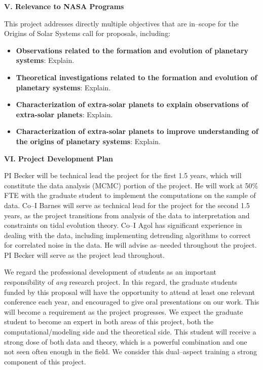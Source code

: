 \bigskip
\centerline{\bf V. Relevance to NASA Programs}
\smallskip

This project addresses directly multiple objectives that are in--scope
for the Origins of Solar Systems call for proposals, including:
\begin{itemize}

\item {\bf Observations related to the formation and evolution of
  planetary systems}: Explain.

\item {\bf Theoretical investigations related to the formation and
  evolution of planetary systems}: Explain.

\item {\bf Characterization of extra-solar planets to explain
  observations of extra-solar planets}: Explain.

\item {\bf Characterization of extra-solar planets to improve
  understanding of the origins of planetary systems}: Explain.

\end{itemize}



\bigskip
\centerline{\bf VI. Project Development Plan}
\smallskip

PI Becker will be technical lead the project for the first 1.5 years,
which will constitute the data analysis (MCMC) portion of the project.
He will work at 50\% FTE with the graduate student to implement the
computations on the \kepler sample of data.  Co--I Barnes will serve as
technical lead for the project for the second 1.5 years, as the
project transitions from analysis of the data to interpretation and
constraints on tidal evolution theory.  Co--I Agol has significant
experience in dealing with the \kepler data, including implementing
detrending algorithms to correct for correlated noise in the \kepler
data.  He will advise as--needed throughout the project.  PI Becker
will serve as the project lead throughout.

We regard the professional development of students as an important
responsibility of {\it any} research project.  In this regard, the
graduate students funded by this proposal will have the opportunity to
attend at least one relevant conference each year, and encouraged to
give oral presentations on our work.  This will become a requirement
as the project progresses.  We expect the graduate student to become
an expert in both areas of this project, both the
computational/modeling side and the theoretical side.  This student
will receive a strong dose of both data and theory, which is a
powerful combination and one not seen often enough in the field.  We
consider this dual--aspect training a strong component of this
project.

